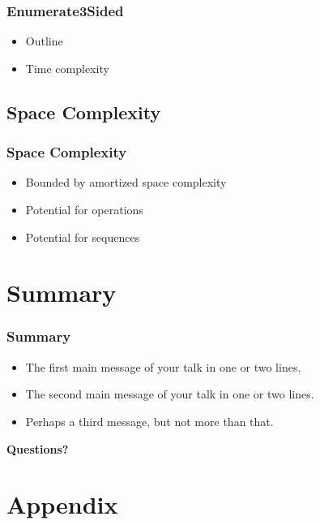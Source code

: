 \documentclass{beamer}
\begin{document}
\begin{frame}
  \frametitle{Enumerate3Sided}

  \begin{itemize}
  \item
    Outline 
  \item
    Time complexity
  \end{itemize}
\end{frame}

\subsection{Space Complexity}

\begin{frame}
  \frametitle{Space Complexity}

  \begin{itemize}
  \item
    Bounded by amortized space complexity
  \item
    Potential for operations
  \item
    Potential for sequences
  \end{itemize}  
\end{frame}

\section*{Summary}

\begin{frame}
  \frametitle<presentation>{Summary}

  \begin{itemize}
  \item
    The \alert{first main message} of your talk in one or two lines.
  \item
    The \alert{second main message} of your talk in one or two lines.
  \item
    Perhaps a \alert{third message}, but not more than that.
  \end{itemize}

\end{frame}

\begin{frame}
  \begin{center}
    {\bf Questions?}
  \end{center}
\end{frame}

\section*{Appendix}
\end{document}
